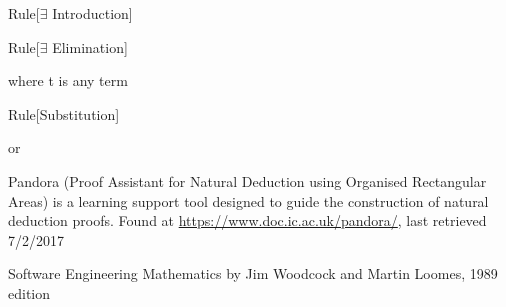 \begin{namedthm}{Rule}[$\exists$ Introduction]

\begin{bprooftree}
\end{bprooftree}\qquad

\end{namedthm}

\begin{namedthm}{Rule}[$\exists$ Elimination]

\begin{bprooftree}
\end{bprooftree}\qquad where t is any term

\end{namedthm}

\begin{namedthm}{Rule}[Substitution]

\begin{bprooftree}
\end{bprooftree}\qquad or \qquad
\begin{bprooftree}
\end{bprooftree}

\end{namedthm}

\pagebreak

\begin{thebibliography}{9}

Pandora (Proof Assistant for Natural Deduction using Organised Rectangular Areas) is a learning support tool designed to guide the construction of natural deduction proofs. Found at \url{https://www.doc.ic.ac.uk/pandora/}, last retrieved 7/2/2017

Software Engineering Mathematics by Jim Woodcock and Martin Loomes, 1989 edition


\end{thebibliography}




